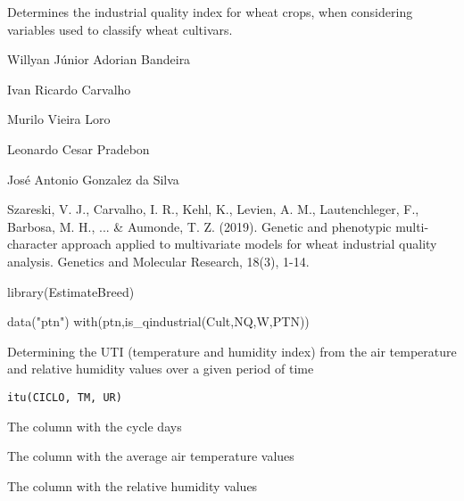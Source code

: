 \documentclass[a4paper]{book}
\begin{document}
%
\begin{Value}
Determines the industrial quality index for wheat crops, when
considering variables used to classify wheat cultivars.
\end{Value}
%
\begin{Author}
Willyan Júnior Adorian Bandeira

Ivan Ricardo Carvalho

Murilo Vieira Loro

Leonardo Cesar Pradebon

José Antonio Gonzalez da Silva
\end{Author}
%
\begin{References}
Szareski, V. J., Carvalho, I. R., Kehl, K., Levien, A. M.,
Lautenchleger, F., Barbosa, M. H., ... \& Aumonde, T. Z. (2019).
Genetic and phenotypic multi-character approach applied to multivariate
models for wheat industrial quality analysis.
Genetics and Molecular Research, 18(3), 1-14.
\end{References}
%
\begin{Examples}
\begin{ExampleCode}

library(EstimateBreed)

data("ptn")
with(ptn,is_qindustrial(Cult,NQ,W,PTN))

\end{ExampleCode}
\end{Examples}
%
\begin{Description}
Determining the UTI (temperature and humidity index) from the air temperature
and relative humidity values over a given period of time
\end{Description}
%
\begin{Usage}
\begin{verbatim}
itu(CICLO, TM, UR)
\end{verbatim}
\end{Usage}
%
\begin{Arguments}
\begin{ldescription}
\item[\code{CICLO}] The column with the cycle days

\item[\code{TM}] The column with the average air temperature values

\item[\code{UR}] The column with the relative humidity values
\end{ldescription}
\end{Arguments}
\end{document}
